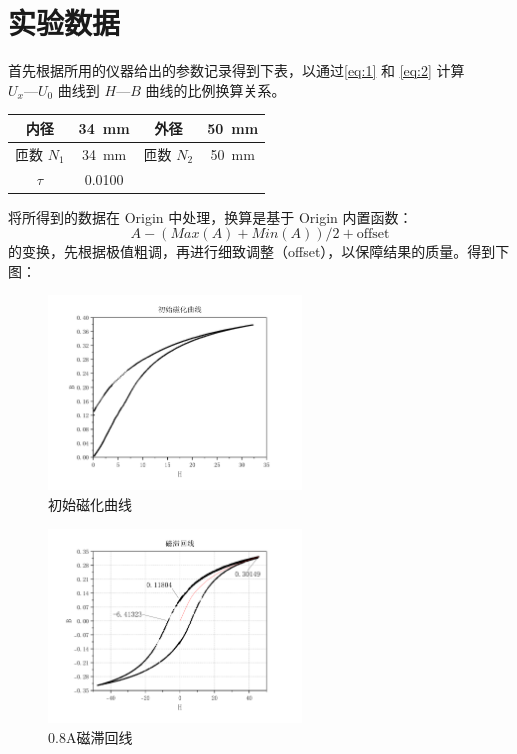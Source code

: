 \documentclass[a4paper,utf8]{article}
\begin{document}
\section{实验数据}
    首先根据所用的仪器给出的参数记录得到下表，以通过\eqref{eq:1} 和 \eqref{eq:2} 计算 $U_x—U_0$ 曲线到 $H—B$ 曲线的比例换算关系。
    \begin{table}[!ht]
        \centering\begin{tabular}{c c|c c}\hline
             内径 & \SI{34}{\mm} & 外径 & \SI{50}{\mm} \\ \hline
             匝数 $N_1$ & \SI{34}{\mm} & 匝数 $N_2$ & \SI{50}{\mm} \\ \hline
             $\tau$ & 0.0100 &  &  \\ \hline
        \end{tabular}
    \end{table}\par
    将所得到的数据在 Origin 中处理，换算是基于 Origin 内置函数： $$A-(Max(A)+Min(A))/2 + \text{offset} $$ 的变换，先根据极值粗调，再进行细致调整（offset），以保障结果的质量。得到下图：
    \begin{figure}[!ht]
        \includegraphics[width=0.6\textwidth]{fig2.pdf}
        \caption{初始磁化曲线}\label{fig:2a}
    \end{figure}
    \begin{figure}[!ht]
        \includegraphics[width=0.6\textwidth]{fig3.pdf}
        \caption{0.8A磁滞回线}\label{fig:2b}
    \end{figure}
\end{document}
